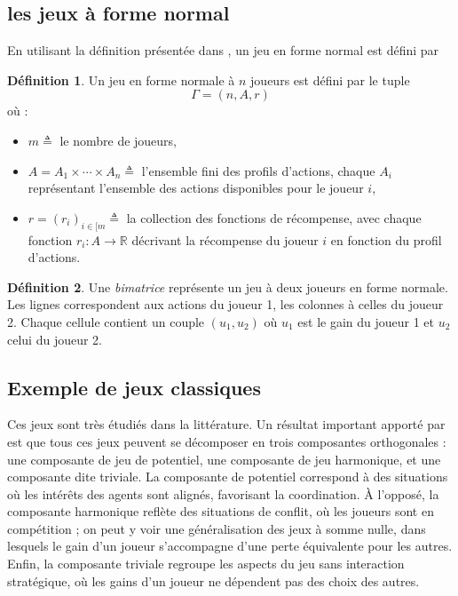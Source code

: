 \documentclass{article}
\theoremstyle{definition}
\newtheorem{definition}{Définition}
\begin{document}
\subsection{les jeux à forme normal}
En utilisant la définition présentée dans \citet{yongacoglu_paths_2024}, un jeu en forme normal est défini par 
\begin{definition}
Un jeu en forme normale à $n$ joueurs est défini par le tuple
\[
\Gamma = (n, A, r)
\]
où :
\begin{itemize}
    \item $m \triangleq$ le nombre de joueurs,
    \item $A = A_{1} \times \cdots \times A_{n} \triangleq$ l'ensemble fini des profils d'actions, chaque $A_{i}$ représentant l'ensemble des actions disponibles pour le joueur $i$,
    \item $r = (r_{i})_{i \in [m} \triangleq$ la collection des fonctions de récompense, avec chaque fonction $r_{i} : A \rightarrow \mathbb{R}$ décrivant la récompense du joueur $i$ en fonction du profil d'actions.
\end{itemize}
\end{definition}


\begin{definition}
Une \emph{bimatrice} représente un jeu à deux joueurs en forme normale. Les lignes correspondent aux actions du joueur 1, les colonnes à celles du joueur 2. Chaque cellule contient un couple $(u_1, u_2)$ où $u_1$ est le gain du joueur 1 et $u_2$ celui du joueur 2. 
\end{definition}


\subsection{Exemple de jeux classiques}
Ces jeux sont très étudiés dans la littérature. Un résultat important apporté par \citet{candogan_flows_2011} est que tous ces jeux peuvent se décomposer en trois composantes orthogonales : une composante de jeu de potentiel, une composante de jeu harmonique, et une composante dite triviale. La composante de potentiel correspond à des situations où les intérêts des agents sont alignés, favorisant la coordination. À l’opposé, la composante harmonique reflète des situations de conflit, où les joueurs sont en compétition ; on peut y voir une généralisation des jeux à somme nulle, dans lesquels le gain d’un joueur s’accompagne d’une perte équivalente pour les autres. Enfin, la composante triviale regroupe les aspects du jeu sans interaction stratégique, où les gains d’un joueur ne dépendent pas des choix des autres.
\end{document}
